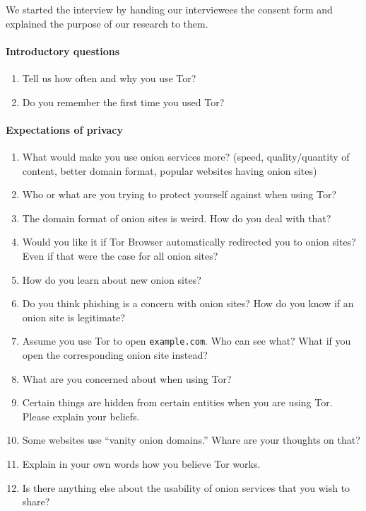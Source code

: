 We started the interview by handing our interviewees the consent form and
explained the purpose of our research to them.

\paragraph{Introductory questions}
\begin{enumerate}
    \item Tell us how often and why you use Tor?
    \item Do you remember the first time you used Tor?
\end{enumerate}

\paragraph{Expectations of privacy}
\begin{enumerate}
    \item What would make you use onion services more? (speed, quality/quantity
        of content, better domain format, popular websites having onion sites)
    \item Who or what are you trying to protect yourself against when using Tor?
    \item The domain format of onion sites is weird.  How do you deal with that?
    \item Would you like it if Tor Browser automatically redirected you to onion
        sites?  Even if that were the case for all onion sites?
    \item How do you learn about new onion sites?
    \item Do you think phishing is a concern with onion sites?  How do you know
        if an onion site is legitimate?
    \item Assume you use Tor to open \texttt{example.com}.  Who can see what?
        What if you open the corresponding onion site instead?
    \item What are you concerned about when using Tor?
    \item Certain things are hidden from certain entities when you are using
        Tor.  Please explain your beliefs.
    \item Some websites use ``vanity onion domains.''  Whare are your thoughts
        on that?
    \item Explain in your own words how you believe Tor works.
    \item Is there anything else about the usability of onion services that you
        wish to share?
\end{enumerate}

